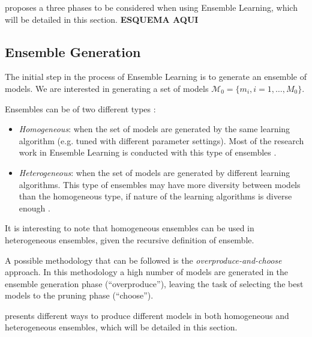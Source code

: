 
\textcite{Mendes-Moreira2012} proposes a three phases to be considered when using Ensemble Learning, which will be detailed in this section. \textbf{ESQUEMA AQUI}


\subsection{Ensemble Generation}\label{sec:ens_gen}

The initial step in the process of Ensemble Learning is to generate an ensemble of models. We are interested in generating a set of models $\mathcal{M}_0 = \{ m_i, i = 1, \dots, M_0 \}$.

Ensembles can be of two different types \cite{Mendes-Moreira2012}:

\begin{itemize}
	\item \textit{Homogeneous}: when the set of models are generated by the same learning algorithm (e.g. tuned with different parameter settings). Most of the research work in Ensemble Learning is conducted with this type of ensembles \cite{Mendes-Moreira2012}.
	\item \textit{Heterogeneous}: when the set of models are generated by different learning algorithms. This type of ensembles may have more diversity between models than the homogeneous type, if nature of the learning algorithms is diverse enough \cite{Mendes-Moreira2012}.
\end{itemize}

It is interesting to note that homogeneous ensembles can be used in heterogeneous ensembles, given the recursive definition of ensemble.

A possible methodology that can be followed is the \textit{overproduce-and-choose} approach.
In this methodology a high number of models are generated in the ensemble generation phase (``overproduce''), leaving the task of selecting the best models to the pruning phase (``choose'').	

\textcite{Mendes-Moreira2012} presents different ways to produce different models in both homogeneous and heterogeneous ensembles, which will be detailed in this section.

